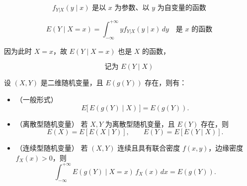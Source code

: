 \begin{note}
    \[
f_{Y|X}(y \mid x)\text{ 是以 } x \text{ 为参数、以 } y \text{ 为自变量的函数}
\]

\[
E(Y \mid X = x) = \int_{-\infty}^{+\infty} y f_{Y|X}(y \mid x)\, dy \quad \text{是 } x \text{ 的函数}
\]

因为此时 \(X = x\)，故 \(E(Y \mid X = x)\) 也是 \(X\) 的函数，

\[
\text{记为 } \boxed{E(Y \mid X)}
\]
\end{note}

\begin{theorem}
设 $(X,Y)$ 是二维随机变量，且 $E(g(Y))$ 存在，则有：

\begin{itemize}
    \item[(1)] （一般形式）
    \[
        E \big[\, E(g(Y)\mid X ) \,\big] = E(g(Y)).
    \]

    \item[(2)] （离散型随机变量）
    若 $X, Y$ 为离散型随机变量，且 $E(Y)$ 存在，则
    \[
        E(X) = E[E(X\mid Y)], \qquad
        E(Y) = E[E(Y\mid X)].
    \]

    \item[(3)] （连续型随机变量）
    若 $(X,Y)$ 连续且具有联合密度 $f(x,y)$，边缘密度 $f_X(x)>0$，则
    \[
        \int_{-\infty}^{+\infty} E(g(Y)\mid X=x)
        \, f_X(x) \, dx
        = E(g(Y)).
    \]
\end{itemize}

\end{theorem}

























































